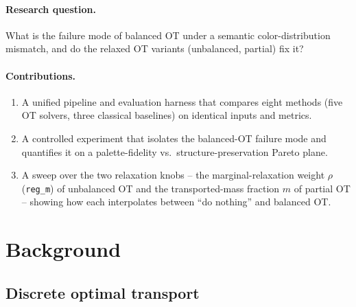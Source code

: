 \documentclass[11pt,a4paper]{article}
\newcommand{\code}[1]{\texttt{#1}}
\begin{document}
\paragraph{Research question.} What is the failure mode of balanced OT under a
semantic color-distribution mismatch, and do the relaxed OT variants
(unbalanced, partial) fix it?

\paragraph{Contributions.}
\begin{enumerate}
  \item A unified pipeline and evaluation harness that compares eight methods
        (five OT solvers, three classical baselines) on identical inputs and
        metrics.
  \item A controlled experiment that isolates the balanced-OT failure mode and
        quantifies it on a palette-fidelity vs.\ structure-preservation Pareto
        plane.
  \item A sweep over the two relaxation knobs -- the marginal-relaxation weight
        $\rho$ (\code{reg\_m}) of unbalanced OT and the transported-mass fraction
        $m$ of partial OT -- showing how each interpolates between
        ``do nothing'' and balanced OT.
\end{enumerate}

\section{Background}
\label{sec:background}

\subsection{Discrete optimal transport}
\end{document}
